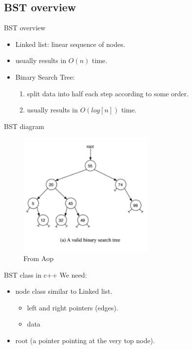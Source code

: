 \documentclass[aspectratio=169]{beamer}
\begin{document}
\subsection{BST overview}
\begin{frame}{BST overview}
    \begin{itemize}
        \item Linked list: linear sequence of nodes.
        \item   usually results in $O(n)$ time.
        \item Binary Search Tree:
            \begin{enumerate}
                \item split data into half each step according to some order.
                \item usually results in $O(log[n])$ time.
            \end{enumerate}
    \end{itemize}
\end{frame}

\begin{frame}{BST diagram}
        \begin{figure}
            \includegraphics[width=0.6\textwidth]{BST_fig.png}
            \caption{From Aop}
    \end{figure}
\end{frame}

\begin{frame}{BST class in c++}
    We need:
    \begin{itemize}
        \item node class similar to Linked list.
            \begin{itemize}
                \item left and right pointers (edges). 
                \item data
            \end{itemize}
        \item root (a pointer pointing at the very top node).
    \end{itemize}
\end{frame}
\end{document}
